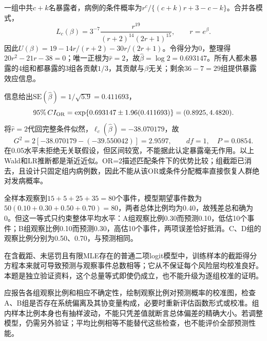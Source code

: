 一组中共$c+k$名暴露者，病例的条件概率为$r^c/\{(c+k)r+3-c-k\}$。合并各模式，\[L_c(\beta)=3^{-7}\frac{r^{19}}{(r+2)^{14}(2r+1)^{15}},\qquad r=e^\beta.\]因此$U(\beta)=19-14r/(r+2)-30r/(2r+1)$。令得分为0，整理得$20r^2-21r-38=0$；唯一正根为$\hat r=2$，故$\hat\beta=\log2=0.693147$。所有人都未暴露的4组和都暴露的3组各贡献$1/3$，其贡献与$\beta$无关；剩余$36-7=29$组提供暴露效应信息。\par 信息给出$\mathrm{SE}(\hat\beta)=1/\sqrt{5.9}=0.411693$，\[95\%\,CI_{\rm OR}=\exp\{0.693147\pm1.96(0.411693)\}=(0.8925,4.4820).\]将$\hat r=2$代回完整条件似然，$\ell_c(\hat\beta)=-38.070179$，故\[G^2=2[-38.070179-(-39.550042)]=2.9597,\qquad df=1,\quad P=0.0854.\]在0.05水平未拒绝无关联假设，但区间较宽，不能据此认定暴露毫无作用。以上Wald和LR推断都是渐近近似。OR=2描述匹配条件下的优势比较；组截距已消去，且设计只固定组内病例数，因此不能从该OR或条件分配概率直接恢复人群绝对发病概率。
\par\nobreak\smallskip{}

全样本观察到$15+5+25+35=80$个事件，模型期望事件数为$50(0.10+0.30+0.50+0.70)=80$，两者总体比例均为0.40，故残差总和确为0。但这一等式只约束整体平均水平：A组观察比例0.30而预测0.10，低估10个事件；B组观察比例0.10而预测0.30，高估10个事件，两项误差恰好抵消。C、D组的观察比例分别为0.50、0.70，与预测相同。\par 在含截距、未惩罚且有限MLE存在的普通二项logit模型中，训练样本的截距得分方程本来就可导致预测与观察事件总数相等；它从不保证每个风险层均校准良好。本题是独立验证资料，这个总量等式即使仍成立，也不能升级为逐组校准的证明。\par 应报告各组观察比例和相应不确定性，绘制观察比例对预测概率的校准图，检查A、B组是否存在系统偏离及其协变量构成，必要时重新评估函数形式或校准。组内样本比例本身也有抽样波动，不能只凭差值就断言总体偏差的精确大小。若调整模型，仍需另外验证；平均比例相等不能替代这些检查，也不能评价全部预测性能。
\par\nobreak\smallskip{}
